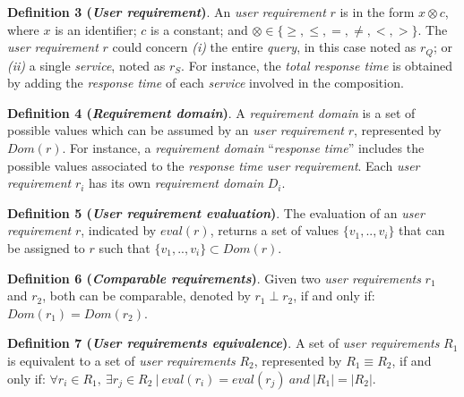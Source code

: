 \bigskip
\noindent \textbf{Definition 3 (\textsl{User requirement})}.
An \textsl{user requirement} $r$ is in the form $x \otimes c$, where $x$ is an identifier; $c$ is a constant; and $\otimes \in\lbrace \geq, \leq, =, \neq, <, >\rbrace$. 
%
The \textsl{user requirement} $r$ could concern \textit{(i)} the entire \textsl{query}, in this case noted as $r_{Q}$; or \textit{(ii)} a single \textsl{service}, noted as $r_{S}$. For instance, the \textsl{total response time} is obtained by adding the \textsl{response time} of each \textsl{service} involved in the composition.

\bigskip
\noindent \textbf{Definition 4 (\textsl{Requirement domain})}. A \textsl{requirement domain} is a set of possible values which can be assumed by an \textsl{user requirement} $r$, represented by $Dom(r)$. For instance, a \textsl{requirement domain} ``\textit{response time}'' includes the possible values associated to the \textit{response time} \textsl{user requirement}. Each \textsl{user requirement} $r_{i}$ has its own \textsl{requirement domain} $D_{i}$. 

\bigskip
\noindent \textbf{Definition 5 (\textsl{User requirement evaluation})}. The evaluation of an \textsl{user requirement} $r$, indicated by $eval(r)$, returns a set of values $\lbrace v_{1},..,v_{i} \rbrace$ that can be assigned to $r$ such that $\lbrace v_{1},..,v_{i} \rbrace \subset Dom(r)$.

\bigskip
\noindent \textbf{Definition 6 (\textsl{Comparable requirements})}. Given two \textsl{user requirements} $r_{1}$ and $r_{2}$, both can be comparable, denoted by $r_{1} \perp r_{2}$, if and only if:  $Dom(r_{1}) = Dom(r_{2})$.

\bigskip
\noindent \textbf{Definition 7 (\textsl{User requirements equivalence})}.
A set of \textsl{user requirements} $R_{1}$ is equivalent to a set of \textsl{user requirements} $R_{2}$, represented by $R_{1} \equiv R_{2}$, if and only if: $\forall r_{i} \in R_{1}, \ \exists r_{j} \in R_{2} \ \vert \ eval (r_{i}) = eval(r_{j}) \ and \ \vert R_{1} \vert = \vert R_{2} \vert$.

